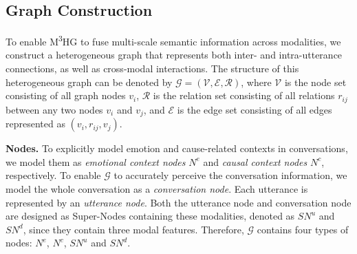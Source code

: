\documentclass[11pt]{article}
\begin{document}
\subsection{Graph Construction}
To enable M\textsuperscript{3}HG to fuse multi-scale semantic information across modalities, we construct a heterogeneous graph that represents both inter- and intra-utterance connections, as well as cross-modal interactions.
The structure of this heterogeneous graph can be denoted by $\mathcal{G}=(\mathcal{V},\mathcal{E},\mathcal{R})$, where $\mathcal{V}$ is the node set consisting of all graph nodes $v_i$, $\mathcal{R}$ is the relation set consisting of all relations $r_{ij}$ between any two nodes $v_i$ and $v_j$, and $\mathcal{E}$ is the edge set consisting of all edges represented as $(v_i,r_{ij},v_j)$.


\noindent\textbf{Nodes.} To explicitly model emotion and cause-related contexts in conversations, we model them as \textit{emotional context nodes} $N^e$ and \textit{causal context nodes} $N^c$, respectively.
To enable $\mathcal{G}$ to accurately perceive the conversation information, we model the whole conversation as a \textit{conversation node}.
Each utterance is represented by an \textit{utterance node}. 
Both the utterance node and conversation node are designed as Super-Nodes containing these modalities, denoted as $SN^u$ and $SN^d$, since they contain three modal features.
Therefore, $\mathcal{G}$ contains four types of nodes: $N^e$, $N^c$, $SN^u$ and $SN^d$.
\end{document}
